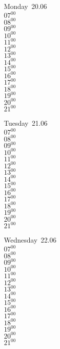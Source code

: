 \documentclass[11pt,a4paper]{book}\usepackage[]{graphicx}\usepackage[]{color}
\begin{document}
\begin{headerbox}
\end{headerbox}
\begin{weekdaybox}
  Monday~20.06\\
  { 
  \vfill
  $07^{00}$\\
$08^{00}$\\
$09^{00}$\\
$10^{00}$\\
$11^{00}$\\
$12^{00}$\\
$13^{00}$\\
$14^{00}$\\
$15^{00}$\\
$16^{00}$\\
$17^{00}$\\
$18^{00}$\\
$19^{00}$\\
$20^{00}$\\
$21^{00}$\\
  }
\end{weekdaybox}
\begin{weekdaybox}
  Tuesday~21.06\\
  { 
  \vfill
  $07^{00}$\\
$08^{00}$\\
$09^{00}$\\
$10^{00}$\\
$11^{00}$\\
$12^{00}$\\
$13^{00}$\\
$14^{00}$\\
$15^{00}$\\
$16^{00}$\\
$17^{00}$\\
$18^{00}$\\
$19^{00}$\\
$20^{00}$\\
$21^{00}$\\
  }
\end{weekdaybox}
\begin{weekdaybox}
  Wednesday~22.06\\
  { 
  \vfill
  $07^{00}$\\
$08^{00}$\\
$09^{00}$\\
$10^{00}$\\
$11^{00}$\\
$12^{00}$\\
$13^{00}$\\
$14^{00}$\\
$15^{00}$\\
$16^{00}$\\
$17^{00}$\\
$18^{00}$\\
$19^{00}$\\
$20^{00}$\\
$21^{00}$\\
  }
\end{weekdaybox}
\end{document}
